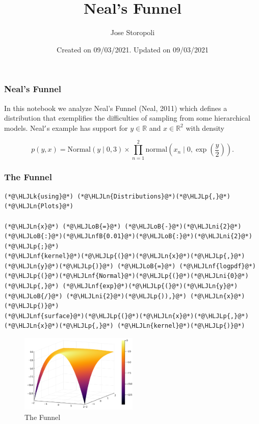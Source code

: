 \documentclass{beamer}
\title{ Neal's Funnel }
\author{ Jose Storopoli }
\date{ Created on 09/03/2021. Updated on 09/03/2021 }
\newcommand{\HLJLk}[1]{\textcolor[RGB]{148,91,176}{\textbf{#1}}}
\newcommand{\HLJLn}[1]{#1}
\newcommand{\HLJLnf}[1]{\textcolor[RGB]{66,102,213}{#1}}
\newcommand{\HLJLnfB}[1]{\textcolor[RGB]{59,151,46}{#1}}
\newcommand{\HLJLni}[1]{\textcolor[RGB]{59,151,46}{#1}}
\newcommand{\HLJLoB}[1]{\textcolor[RGB]{102,102,102}{\textbf{#1}}}
\newcommand{\HLJLp}[1]{#1}
\begin{document}
\begin{frame}
\titlepage
\end{frame}





\begin{frame}[fragile]
\frametitle{Neal's Funnel}

In this notebook we analyze Neal's Funnel (Neal, 2011) which defines a distribution that exemplifies the difficulties of sampling from some hierarchical models. Neal\ensuremath{\rq}s example has support for  $y \in \mathbb{R}$ and $x \in \mathbb{R}^2$ with density

\[
p(y,x) = \text{Normal}(y \mid 0,3) \times
\prod_{n=1}^2
\text{normal}\left(x_n \mid 0,\exp\left(\frac{y}{2}\right)\right).
\]


\end{frame}


\begin{frame}[fragile]
\frametitle{The Funnel}


\begin{lstlisting}
(*@\HLJLk{using}@*) (*@\HLJLn{Distributions}@*)(*@\HLJLp{,}@*) (*@\HLJLn{Plots}@*)

(*@\HLJLn{x}@*) (*@\HLJLoB{=}@*) (*@\HLJLoB{-}@*)(*@\HLJLni{2}@*)(*@\HLJLoB{:}@*)(*@\HLJLnfB{0.01}@*)(*@\HLJLoB{:}@*)(*@\HLJLni{2}@*)(*@\HLJLp{;}@*)
(*@\HLJLnf{kernel}@*)(*@\HLJLp{(}@*)(*@\HLJLn{x}@*)(*@\HLJLp{,}@*) (*@\HLJLn{y}@*)(*@\HLJLp{)}@*) (*@\HLJLoB{=}@*) (*@\HLJLnf{logpdf}@*)(*@\HLJLp{(}@*)(*@\HLJLnf{Normal}@*)(*@\HLJLp{(}@*)(*@\HLJLni{0}@*)(*@\HLJLp{,}@*) (*@\HLJLnf{exp}@*)(*@\HLJLp{(}@*)(*@\HLJLn{y}@*) (*@\HLJLoB{/}@*) (*@\HLJLni{2}@*)(*@\HLJLp{)),}@*) (*@\HLJLn{x}@*)(*@\HLJLp{)}@*)
(*@\HLJLnf{surface}@*)(*@\HLJLp{(}@*)(*@\HLJLn{x}@*)(*@\HLJLp{,}@*) (*@\HLJLn{x}@*)(*@\HLJLp{,}@*) (*@\HLJLn{kernel}@*)(*@\HLJLp{)}@*)
\end{lstlisting}

\begin{figure}[!h]
\center
\includegraphics[width=0.5\textwidth]{images_slides/Neals_funnel_slides_funneldensity_1.pdf}
\caption{The Funnel}
\label{fig:funneldensity}
\end{figure}



\end{frame}
\end{document}
